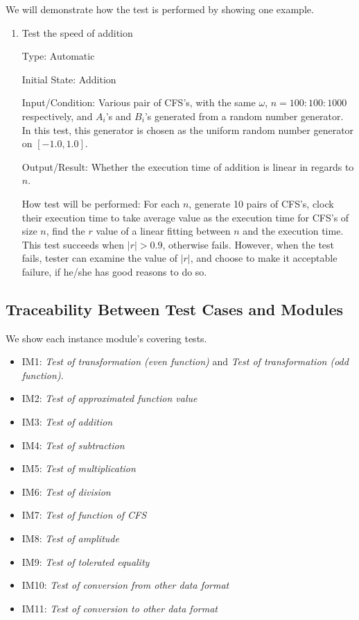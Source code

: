 \documentclass[12pt, titlepage]{article}
\begin{document}
We will demonstrate how the test is performed by showing one example.
\begin{enumerate}
	
	\item{Test the speed of addition\\}
	
	Type: Automatic
	
	Initial State: Addition
	
	Input/Condition: Various pair of CFS's, with the same $\omega$,
        $n=100:100:1000$ respectively, and $A_i$'s and $B_i$'s generated from a
        random number generator. In this test, this generator is chosen as the
        uniform random number generator on $[-1.0, 1.0]$.
	
	Output/Result: Whether the execution time of addition is linear in regards to $n$.
	
	How test will be performed: For each $n$, generate 10 pairs of CFS's,
        clock their execution time to take average value as the execution time
        for CFS's of size $n$, find the $r$ value of a linear fitting between
        $n$ and the execution time. This test succeeds when $|r|>0.9$, otherwise
        fails. However, when the test fails, tester can examine the value of
        $|r|$, and choose to make it acceptable failure, if he/she has good
        reasons to do so.
	
\end{enumerate}

\subsection{Traceability Between Test Cases and Modules}
We show each instance module's covering tests.

\begin{itemize}
\item IM1: \textit{Test of transformation (even function)} and \textit{Test of
    transformation (odd function)}.
\item IM2: \textit{Test of approximated function value}
\item IM3: \textit{Test of addition}
\item IM4: \textit{Test of subtraction}
\item IM5: \textit{Test of multiplication}
\item IM6: \textit{Test of division}
\item IM7: \textit{Test of function of CFS}
\item IM8: \textit{Test of amplitude}
\item IM9: \textit{Test of tolerated equality}
\item IM10: \textit{Test of conversion from other data format}
\item IM11: \textit{Test of conversion to other data format}
\end{itemize}
				



\end{document}
